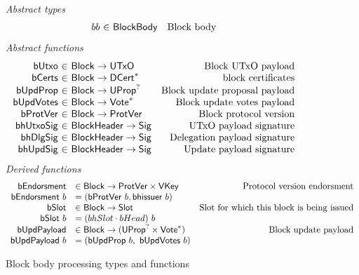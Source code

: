 \documentclass[11pt,a4paper]{article}
\newcommand{\fun}[1]{\mathsf{#1}}
\newcommand{\type}[1]{\mathsf{#1}}
\newcommand{\seqof}[1]{#1^{*}}
\newcommand{\totalf}{\to}
\newcommand{\Slot}{\type{Slot}}
\newcommand{\Block}{\type{Block}}
\newcommand{\DCert}{\type{DCert}}
\newcommand{\VKey}{\type{VKey}}
\newcommand{\Sig}{\type{Sig}}
\newcommand{\bcertsname}{bCerts}
\newcommand{\bhissuername}{bhissuer}
\newcommand{\bhissuer}[1]{\fun{\bhissuername} ~ #1}
\begin{document}
\begin{figure}[ht]
  \emph{Abstract types}
  \begin{equation*}
    \begin{array}{r@{~\in~}lr}
      bb & \Bbody & \text{Block body} \\

    \end{array}
  \end{equation*}
  \emph{Abstract functions}
  \begin{equation*}
    \begin{array}{r@{~\in~}lr}
      \fun{bUtxo} & \Block \totalf \UTxO & \text{Block UTxO payload} \\
      \fun{\bcertsname} & \Block \totalf \seqof{\DCert}
                                         & \text{block certificates} \\
      \fun{bUpdProp} & \Block \totalf \UProp^{?} & \text{Block update proposal payload} \\
      \fun{bUpdVotes} & \Block \totalf \seqof{\Vote} & \text{Block update votes payload} \\
      \fun{bProtVer} & \Block \totalf \ProtVer & \text{Block protocol version} \\
      \fun{bhUtxoSig} & \Bhead \totalf \Sig & \text{UTxO payload signature} \\
      \fun{bhDlgSig} & \Bhead \totalf \Sig & \text{Delegation payload signature} \\
      \fun{bhUpdSig} & \Bhead \totalf \Sig & \text{Update payload signature} \\
    \end{array}
  \end{equation*}
  \emph{Derived functions}
  \begin{equation*}
    \begin{array}{rlr}
      \fun{bEndorsment} & \in \Block \to \ProtVer \times \VKey & \text{Protocol version endorsment} \\
      \bendorsment{b} & = (\bprotver{b}, \bhissuer{b}) \\
      \fun{\bslotname} & \in \Block \to \Slot & \text{Slot for which this block is being issued} \\
      \bslot{b} & = (\bhslotname \cdot \bheadname)~b \\
      \fun{\bupdpayloadname} & \in \Block \to (\UProp^{?}\times\seqof{\Vote}) & \text{Block update payload} \\
      \bupdpayload{b} & = (\bupdprop{b},~\bupdvotes{b})
    \end{array}
  \end{equation*}
  \caption{Block body processing types and functions}
  \label{fig:defs:bbody}
\end{figure}
\end{document}
